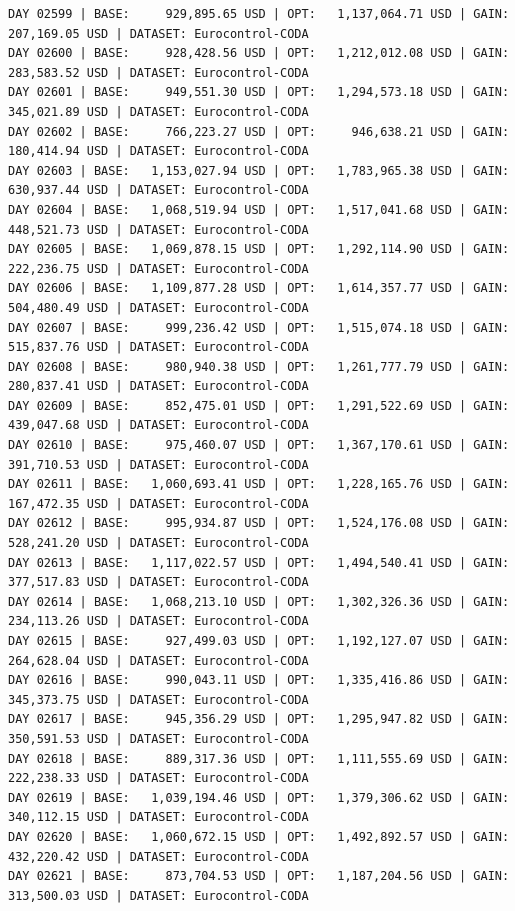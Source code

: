 \documentclass[11pt,a4paper]{article}
\begin{document}
\begin{verbatim}
DAY 02599 | BASE:     929,895.65 USD | OPT:   1,137,064.71 USD | GAIN: 207,169.05 USD | DATASET: Eurocontrol-CODA
DAY 02600 | BASE:     928,428.56 USD | OPT:   1,212,012.08 USD | GAIN: 283,583.52 USD | DATASET: Eurocontrol-CODA
DAY 02601 | BASE:     949,551.30 USD | OPT:   1,294,573.18 USD | GAIN: 345,021.89 USD | DATASET: Eurocontrol-CODA
DAY 02602 | BASE:     766,223.27 USD | OPT:     946,638.21 USD | GAIN: 180,414.94 USD | DATASET: Eurocontrol-CODA
DAY 02603 | BASE:   1,153,027.94 USD | OPT:   1,783,965.38 USD | GAIN: 630,937.44 USD | DATASET: Eurocontrol-CODA
DAY 02604 | BASE:   1,068,519.94 USD | OPT:   1,517,041.68 USD | GAIN: 448,521.73 USD | DATASET: Eurocontrol-CODA
DAY 02605 | BASE:   1,069,878.15 USD | OPT:   1,292,114.90 USD | GAIN: 222,236.75 USD | DATASET: Eurocontrol-CODA
DAY 02606 | BASE:   1,109,877.28 USD | OPT:   1,614,357.77 USD | GAIN: 504,480.49 USD | DATASET: Eurocontrol-CODA
DAY 02607 | BASE:     999,236.42 USD | OPT:   1,515,074.18 USD | GAIN: 515,837.76 USD | DATASET: Eurocontrol-CODA
DAY 02608 | BASE:     980,940.38 USD | OPT:   1,261,777.79 USD | GAIN: 280,837.41 USD | DATASET: Eurocontrol-CODA
DAY 02609 | BASE:     852,475.01 USD | OPT:   1,291,522.69 USD | GAIN: 439,047.68 USD | DATASET: Eurocontrol-CODA
DAY 02610 | BASE:     975,460.07 USD | OPT:   1,367,170.61 USD | GAIN: 391,710.53 USD | DATASET: Eurocontrol-CODA
DAY 02611 | BASE:   1,060,693.41 USD | OPT:   1,228,165.76 USD | GAIN: 167,472.35 USD | DATASET: Eurocontrol-CODA
DAY 02612 | BASE:     995,934.87 USD | OPT:   1,524,176.08 USD | GAIN: 528,241.20 USD | DATASET: Eurocontrol-CODA
DAY 02613 | BASE:   1,117,022.57 USD | OPT:   1,494,540.41 USD | GAIN: 377,517.83 USD | DATASET: Eurocontrol-CODA
DAY 02614 | BASE:   1,068,213.10 USD | OPT:   1,302,326.36 USD | GAIN: 234,113.26 USD | DATASET: Eurocontrol-CODA
DAY 02615 | BASE:     927,499.03 USD | OPT:   1,192,127.07 USD | GAIN: 264,628.04 USD | DATASET: Eurocontrol-CODA
DAY 02616 | BASE:     990,043.11 USD | OPT:   1,335,416.86 USD | GAIN: 345,373.75 USD | DATASET: Eurocontrol-CODA
DAY 02617 | BASE:     945,356.29 USD | OPT:   1,295,947.82 USD | GAIN: 350,591.53 USD | DATASET: Eurocontrol-CODA
DAY 02618 | BASE:     889,317.36 USD | OPT:   1,111,555.69 USD | GAIN: 222,238.33 USD | DATASET: Eurocontrol-CODA
DAY 02619 | BASE:   1,039,194.46 USD | OPT:   1,379,306.62 USD | GAIN: 340,112.15 USD | DATASET: Eurocontrol-CODA
DAY 02620 | BASE:   1,060,672.15 USD | OPT:   1,492,892.57 USD | GAIN: 432,220.42 USD | DATASET: Eurocontrol-CODA
DAY 02621 | BASE:     873,704.53 USD | OPT:   1,187,204.56 USD | GAIN: 313,500.03 USD | DATASET: Eurocontrol-CODA

\end{verbatim}
\end{document}
